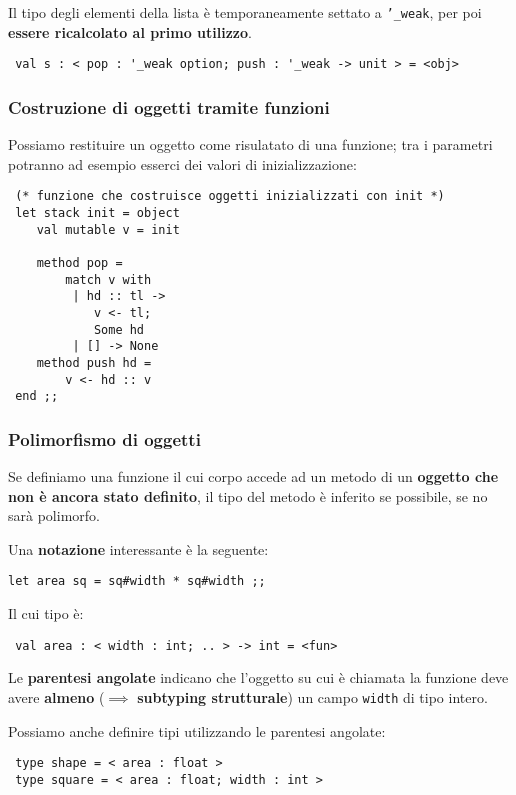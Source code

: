 \documentclass[a4paper,10pt]{article}
\begin{document}
Il tipo degli elementi della lista è temporaneamente settato a \texttt{'\_weak}, per poi \textbf{essere ricalcolato al primo utilizzo}.

\begin{lstlisting}
 val s : < pop : '_weak option; push : '_weak -> unit > = <obj>
\end{lstlisting}

\subsubsection{Costruzione di oggetti tramite funzioni}
Possiamo restituire un oggetto come risulatato di una funzione; tra i parametri potranno ad esempio esserci dei valori di inizializzazione:


\begin{lstlisting}
 (* funzione che costruisce oggetti inizializzati con init *)
 let stack init = object
    val mutable v = init

    method pop =
        match v with
         | hd :: tl ->
            v <- tl;
            Some hd
         | [] -> None
    method push hd =
        v <- hd :: v
 end ;;
\end{lstlisting}

\newpage
\subsubsection{Polimorfismo di oggetti}
Se definiamo una funzione il cui corpo accede ad un metodo di un \textbf{oggetto che non è ancora stato definito}, il tipo del metodo è inferito se possibile, se no sarà polimorfo.\smallskip

Una \textbf{notazione} interessante è la seguente:

\begin{lstlisting}
let area sq = sq#width * sq#width ;;
\end{lstlisting}
Il cui tipo è:
\begin{lstlisting}
 val area : < width : int; .. > -> int = <fun>
\end{lstlisting}

Le \textbf{parentesi angolate} indicano che l'oggetto su cui è chiamata la funzione deve avere \textbf{almeno} ($\implies$ \textbf{subtyping strutturale}) un campo \texttt{width} di tipo intero.\smallskip

Possiamo anche definire tipi utilizzando le parentesi angolate:

\begin{lstlisting}
 type shape = < area : float >
 type square = < area : float; width : int >
\end{lstlisting}
\end{document}
